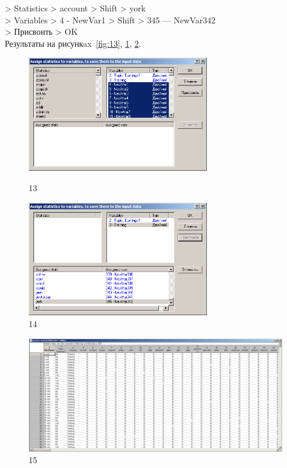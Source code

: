 > Statistics > account > Shift > york \\
> Variables > 4 - NewVar1 > Shift > 345 — NewVar342 \\
> Присвоить > OK \\

Результаты на рисункax~\ref{fig:13}, \ref{fig:14}, \ref{fig:15}.

\begin{figure}[p!h]
  \centering

  \begin{minipage}{0.49\textwidth}
    \centering

    \includegraphics[height=5cm]
    {inc/13.PNG}

    \caption{13}

    \label{fig:13}
  \end{minipage}
  \begin{minipage}{0.49\textwidth}
    \centering

    \includegraphics[height=5cm]
    {inc/14.PNG}

    \caption{14}

    \label{fig:14}
  \end{minipage}
\end{figure}

\begin{figure}[p!h]
  \centering

  \includegraphics[width=17cm]
  {inc/15.PNG}

  \caption{15}

  \label{fig:15}
\end{figure}

